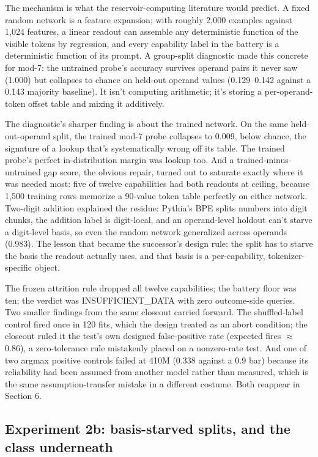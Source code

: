 The mechanism is what the reservoir-computing literature would predict. A
fixed random network is a feature expansion; with roughly 2,000 examples
against 1,024 features, a linear readout can assemble any deterministic
function of the visible tokens by regression, and every capability label
in the battery is a deterministic function of its prompt. A group-split
diagnostic made this concrete for mod-7: the untrained probe's accuracy
survives operand pairs it never saw (1.000) but collapses to chance on
held-out operand values (0.129--0.142 against a 0.143 majority baseline).
It isn't computing arithmetic; it's storing a per-operand-token offset
table and mixing it additively.

The diagnostic's sharper finding is about the trained network. On the
same held-out-operand split, the trained mod-7 probe collapses to 0.009,
below chance, the signature of a lookup that's systematically wrong off
its table. The trained probe's perfect in-distribution margin was lookup
too. And a trained-minus-untrained gap score, the obvious repair, turned
out to saturate exactly where it was needed most: five of twelve
capabilities had both readouts at ceiling, because 1,500 training rows
memorize a 90-value token table perfectly on either network. Two-digit
addition explained the residue: Pythia's BPE splits numbers into digit
chunks, the addition label is digit-local, and an operand-level holdout
can't starve a digit-level basis, so even the random network generalized
across operands (0.983). The lesson that became the successor's design
rule: the split has to starve the basis the readout actually uses, and
that basis is a per-capability, tokenizer-specific object.

The frozen attrition rule dropped all twelve capabilities; the battery
floor was ten; the verdict was INSUFFICIENT\_DATA with zero outcome-side
queries. Two smaller findings from the same closeout carried forward. The
shuffled-label control fired once in 120 fits, which the design treated
as an abort condition; the closeout ruled it the test's own designed
false-positive rate (expected fires $\approx$ 0.86), a zero-tolerance rule
mistakenly placed on a nonzero-rate test. And one of two argmax positive
controls failed at 410M (0.338 against a 0.9 bar) because its reliability
had been assumed from another model rather than measured, which is the
same assumption-transfer mistake in a different costume. Both reappear in
Section 6.

\subsection{Experiment 2b: basis-starved splits, and the class underneath}\label{experiment-2b-basis-starved-splits-and-the-class-underneath}

